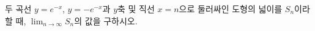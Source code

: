 \hspace*{2mm}\begin{minipage}[t]{\dimexpr\linewidth-2mm\relax}\vspace{0pt}
두 곡선 $y=e^{-x}$, $y=-e^{-x}$과 $y$축 및 직선 $x=n$으로 둘러싸인 도형의 넓이를 $S_n$이라 할 때, $\displaystyle\lim_{n\to\infty}S_n$의 값을 구하시오. \end{minipage}
